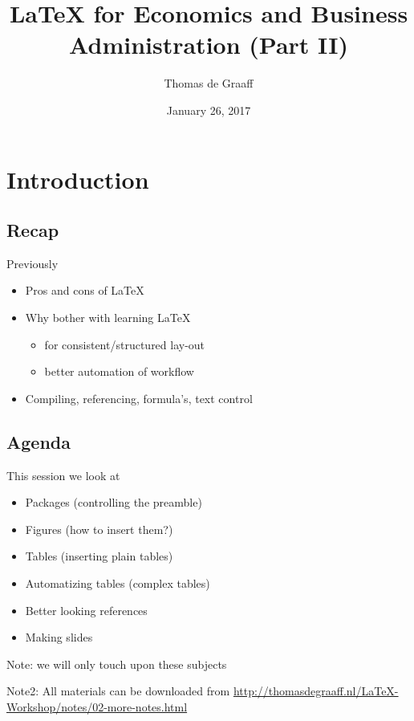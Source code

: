 \documentclass[ignorenonframetext]{beamer}
\title{\LaTeX{} for Economics and Business Administration (Part II)}
\author{Thomas de Graaff}
\date{January 26, 2017}
\begin{document}
\frame{\titlepage}

\section{Introduction}\label{introduction}

\subsection{Recap}\label{introduction-1}

\begin{frame}{Previously}
	\begin{itemize}
		\item Pros and cons of \LaTeX{}
		\newline
		\item Why bother with learning \LaTeX{}
		\begin{itemize}
			\item for consistent/structured lay-out
			\item better automation of workflow
			\newline
		\end{itemize}
		\item Compiling, referencing, formula's, text control
	\end{itemize}
\end{frame}

\subsection{Agenda}

\begin{frame}{This session we look at}
\begin{itemize}
	\item Packages (controlling the preamble)
	\newline
	\item Figures (how to insert them?)
	\newline
	\item Tables (inserting plain tables)
	\newline
	\item Automatizing tables (complex tables)
	\newline
	\item Better looking references
	\newline
	\item Making slides
	\newline
\end{itemize}
	Note: we will only touch upon these subjects
	
	Note2: All materials can be downloaded from \href{http://thomasdegraaff.nl/LaTeX-Workshop/notes/02-more-notes.html}{http://thomasdegraaff.nl/LaTeX-Workshop/notes/02-more-notes.html}
\end{frame}
\end{document}
